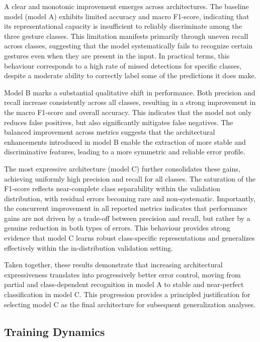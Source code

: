 \documentclass{article}
\begin{document}
A clear and monotonic improvement emerges across architectures. The
baseline model (model A) exhibits limited accuracy and macro F1-score,
indicating that its representational capacity is insufficient to
reliably discriminate among the three gesture classes. This limitation
manifests primarily through uneven recall across classes, suggesting
that the model systematically fails to recognize certain gestures even
when they are present in the input. In practical terms, this behaviour
corresponds to a high rate of missed detections for specific classes,
despite a moderate ability to correctly label some of the predictions it
does make.

Model B marks a substantial qualitative shift in performance. Both
precision and recall increase consistently across all classes, resulting
in a strong improvement in the macro F1-score and overall accuracy. This
indicates that the model not only reduces false positives, but also
significantly mitigates false negatives. The balanced improvement across
metrics suggests that the architectural enhancements introduced in model
B enable the extraction of more stable and discriminative features,
leading to a more symmetric and reliable error profile.

The most expressive architecture (model C) further consolidates these
gains, achieving uniformly high precision and recall for all classes.
The saturation of the F1-score reflects near-complete class separability
within the validation distribution, with residual errors becoming rare
and non-systematic. Importantly, the concurrent improvement in all
reported metrics indicates that performance gains are not driven by a
trade-off between precision and recall, but rather by a genuine
reduction in both types of errors. This behaviour provides strong
evidence that model C learns robust class-specific representations and
generalizes effectively within the in-distribution validation setting.

Taken together, these results demonstrate that increasing architectural
expressiveness translates into progressively better error control,
moving from partial and class-dependent recognition in model A to stable
and near-perfect classification in model C. This progression provides a
principled justification for selecting model C as the final architecture
for subsequent generalization analyses.

\subsection{Training Dynamics}
\end{document}
